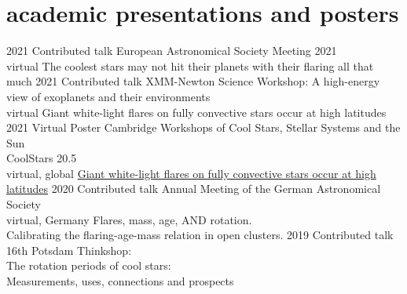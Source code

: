 \documentclass[]{k-cv} %
\begin{document}
\section{academic presentations and posters}

\begin{entrylist}
\entry
{2021}
{Contributed talk}
{European Astronomical Society Meeting 2021\vspace{-.1cm}\\\null\hfill
virtual}
{The coolest stars may not hit their planets with their flaring all that much}
\entry
{2021}
{Contributed talk}
{XMM-Newton Science Workshop: A high-energy view of exoplanets and their environments\vspace{-.1cm}\\\null\hfill
virtual}
{Giant white-light flares on fully convective stars occur at high latitudes}
\entry
{2021}
{Virtual Poster}
{Cambridge Workshops of Cool Stars, Stellar Systems and the Sun \vspace{-.1cm}\\\null\hfill  CoolStars 20.5\vspace{-.1cm}\\\null\hfill
virtual, global}
{\href{https://zenodo.org/record/4558792}{Giant white-light flares on fully convective stars occur at high latitudes}}
\entry
{2020}
{Contributed talk}
{Annual Meeting of the German Astronomical Society\vspace{-.1cm}\\\null\hfill
virtual, Germany}
{Flares, mass, age, AND rotation.\\Calibrating the flaring-age-mass relation in open clusters.}
\entry
{2019}
{Contributed talk}
{16th Potsdam Thinkshop: \vspace{-.1cm}\\\null\hfill
The rotation periods of cool stars:\vspace{-.1cm}\\\null\hfill Measurements, uses, connections and prospects \vspace{-.1cm}\\\null\hfill
}
\end{entrylist}
\end{document}
